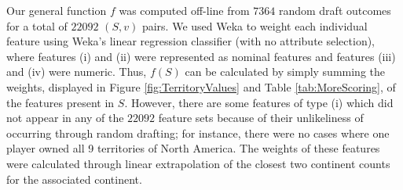 \documentclass[letterpaper]{article}
\numberwithin{equation}{section}
\numberwithin{theorem}{section}
\numberwithin{lemma}{section}
\numberwithin{df}{section}
\begin{document}
Our general function $f$ was computed off-line from $7364$ random draft outcomes for a total of $22092$ $(S,v)$ pairs.  We used Weka \cite{Weka} to weight each individual feature using Weka's linear regression classifier (with no attribute selection), where features (i) and (ii) were represented as nominal features and features (iii) and (iv) were numeric.  Thus, $f(S)$ can be calculated by simply summing the weights, displayed in Figure \ref{fig:TerritoryValues} and Table \ref{tab:MoreScoring}, of the features present in $S$.  However, there are some features of type (i) which did not appear in any of the $22092$ feature sets because of their unlikeliness of occurring through random drafting; for instance, there were no cases where one player owned all 9 territories of North America.  The weights of these features were calculated through linear extrapolation of the closest two continent counts for the associated continent.  %

\end{document}
